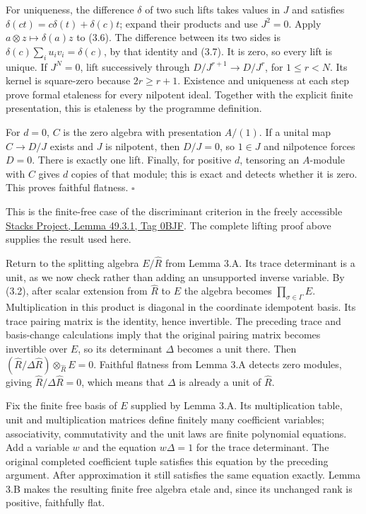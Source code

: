 \documentclass[11pt,a4paper,openany]{report}
\begin{document}
For uniqueness, the difference \(\delta\) of two such lifts takes values in \(J\) and satisfies \(\delta(ct)=c\delta(t)+\delta(c)t\); expand their products and use \(J^2=0\). Apply \(a\otimes z\mapsto\delta(a)z\) to (3.6). The difference between its two sides is \(\delta(c)\sum_i u_iv_i=\delta(c)\), by that identity and (3.7). It is zero, so every lift is unique. If \(J^N=0\), lift successively through \(D/J^{r+1}\to D/J^r\), for \(1\le r<N\). Its kernel is square-zero because \(2r\ge r+1\). Existence and uniqueness at each step prove formal etaleness for every nilpotent ideal. Together with the explicit finite presentation, this is etaleness by the programme definition.

For \(d=0\), \(C\) is the zero algebra with presentation \(A/(1)\). If a unital map \(C\to D/J\) exists and \(J\) is nilpotent, then \(D/J=0\), so \(1\in J\) and nilpotence forces \(D=0\). There is exactly one lift. Finally, for positive \(d\), tensoring an \(A\)-module with \(C\) gives \(d\) copies of that module; this is exact and detects whether it is zero. This proves faithful flatness. \(\square\)

This is the finite-free case of the discriminant criterion in the freely accessible \href{https://stacks.math.columbia.edu/tag/0BJF}{Stacks Project, Lemma 49.3.1, Tag 0BJF}. The complete lifting proof above supplies the result used here.

Return to the splitting algebra \(E/\widehat R\) from Lemma 3.A. Its trace determinant is a unit, as we now check rather than adding an unsupported inverse variable. By (3.2), after scalar extension from \(\widehat R\) to \(E\) the algebra becomes \(\prod_{\sigma\in\Gamma}E\). Multiplication in this product is diagonal in the coordinate idempotent basis. Its trace pairing matrix is the identity, hence invertible. The preceding trace and basis-change calculations imply that the original pairing matrix becomes invertible over \(E\), so its determinant \(\Delta\) becomes a unit there. Then \((\widehat R/\Delta\widehat R)\otimes_{\widehat R}E=0\). Faithful flatness from Lemma 3.A detects zero modules, giving \(\widehat R/\Delta\widehat R=0\), which means that \(\Delta\) is already a unit of \(\widehat R\).

Fix the finite free basis of \(E\) supplied by Lemma 3.A. Its multiplication table, unit and multiplication matrices define finitely many coefficient variables; associativity, commutativity and the unit laws are finite polynomial equations. Add a variable \(w\) and the equation \(w\Delta=1\) for the trace determinant. The original completed coefficient tuple satisfies this equation by the preceding argument. After approximation it still satisfies the same equation exactly. Lemma 3.B makes the resulting finite free algebra etale and, since its unchanged rank is positive, faithfully flat.
\end{document}
